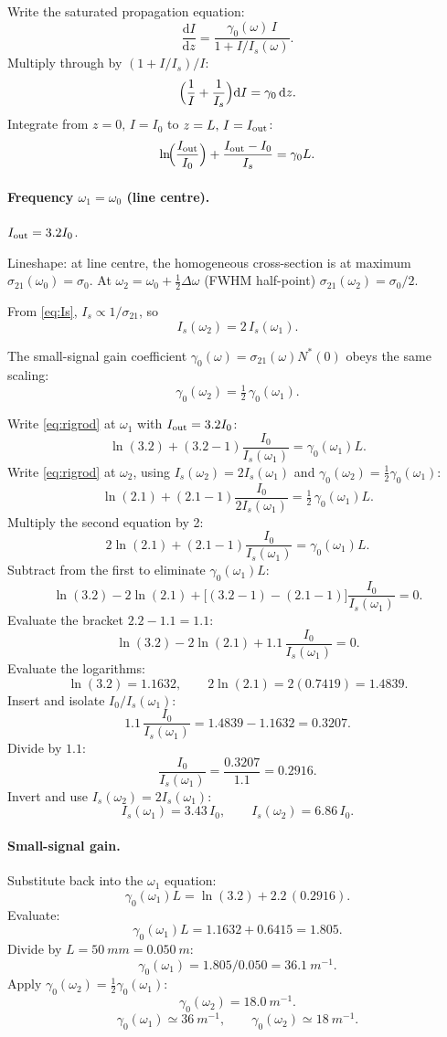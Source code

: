 \documentclass[11pt]{article}
\newcommand{\de}{\mathrm{d}}
\begin{document}
Write the saturated propagation equation:
\[
\frac{\de I}{\de z}=\frac{\gamma_0(\omega)\,I}{1+I/I_s(\omega)}.
\]
Multiply through by $(1+I/I_s)/I$:
\[
\Bigl(\frac{1}{I}+\frac{1}{I_s}\Bigr)\de I=\gamma_0\,\de z.
\]
Integrate from $z=0,\,I=I_0$ to $z=L,\,I=I_{\rm out}$:
\begin{equation}
\ln\!\Bigl(\frac{I_{\rm out}}{I_0}\Bigr)+\frac{I_{\rm out}-I_0}{I_s}=\gamma_0 L.
\label{eq:rigrod}
\end{equation}

\paragraph{Frequency $\omega_1=\omega_0$ (line centre).} $I_{\rm out}=3.2 I_0$.

Lineshape: at line centre, the homogeneous cross-section is at maximum $\sigma_{21}(\omega_0)=\sigma_0$. At $\omega_2=\omega_0+\tfrac12\Delta\omega$ (FWHM half-point) $\sigma_{21}(\omega_2)=\sigma_0/2$.

From \eqref{eq:Is}, $I_s\propto 1/\sigma_{21}$, so
\[
I_s(\omega_2)=2\,I_s(\omega_1).
\]

The small-signal gain coefficient $\gamma_0(\omega)=\sigma_{21}(\omega)N^{*}(0)$ obeys the same scaling:
\[
\gamma_0(\omega_2)=\tfrac12\,\gamma_0(\omega_1).
\]

Write \eqref{eq:rigrod} at $\omega_1$ with $I_{\rm out}=3.2I_0$:
\[
\ln(3.2)+(3.2-1)\frac{I_0}{I_s(\omega_1)}=\gamma_0(\omega_1)L.
\]
Write \eqref{eq:rigrod} at $\omega_2$, using $I_s(\omega_2)=2I_s(\omega_1)$ and $\gamma_0(\omega_2)=\tfrac12\gamma_0(\omega_1)$:
\[
\ln(2.1)+(2.1-1)\frac{I_0}{2 I_s(\omega_1)}=\tfrac12\,\gamma_0(\omega_1)L.
\]
Multiply the second equation by 2:
\[
2\ln(2.1)+(2.1-1)\frac{I_0}{I_s(\omega_1)}=\gamma_0(\omega_1)L.
\]
Subtract from the first to eliminate $\gamma_0(\omega_1)L$:
\[
\ln(3.2)-2\ln(2.1)+\bigl[(3.2-1)-(2.1-1)\bigr]\frac{I_0}{I_s(\omega_1)}=0.
\]
Evaluate the bracket $2.2-1.1=1.1$:
\[
\ln(3.2)-2\ln(2.1)+1.1\,\frac{I_0}{I_s(\omega_1)}=0.
\]
Evaluate the logarithms:
\[
\ln(3.2)=1.1632,\qquad 2\ln(2.1)=2(0.7419)=1.4839.
\]
Insert and isolate $I_0/I_s(\omega_1)$:
\[
1.1\,\frac{I_0}{I_s(\omega_1)}=1.4839-1.1632=0.3207.
\]
Divide by $1.1$:
\[
\frac{I_0}{I_s(\omega_1)}=\frac{0.3207}{1.1}=0.2916.
\]
Invert and use $I_s(\omega_2)=2I_s(\omega_1)$:
\[
\boxed{\;I_s(\omega_1)=3.43\,I_0,\qquad I_s(\omega_2)=6.86\,I_0.\;}
\]

\paragraph{Small-signal gain.} Substitute back into the $\omega_1$ equation:
\[
\gamma_0(\omega_1)L=\ln(3.2)+2.2\,(0.2916).
\]
Evaluate:
\[
\gamma_0(\omega_1)L=1.1632+0.6415=1.805.
\]
Divide by $L=\SI{50}{mm}=\SI{0.050}{m}$:
\[
\gamma_0(\omega_1)=1.805/0.050=\SI{36.1}{m^{-1}}.
\]
Apply $\gamma_0(\omega_2)=\tfrac12\gamma_0(\omega_1)$:
\[
\gamma_0(\omega_2)=\SI{18.0}{m^{-1}}.
\]
\[
\boxed{\;\gamma_0(\omega_1)\simeq\SI{36}{m^{-1}},\qquad\gamma_0(\omega_2)\simeq\SI{18}{m^{-1}}.\;}
\]
\end{document}
